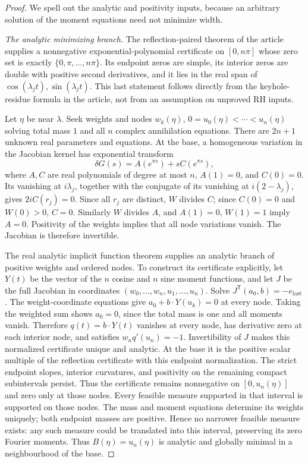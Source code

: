 \begin{proof}
We spell out the analytic and positivity inputs, because an arbitrary
solution of the moment equations need not minimize width.

\emph{The analytic minimizing branch.}
The reflection-paired theorem of the article supplies a nonnegative
exponential-polynomial certificate on $[0,n\pi]$ whose zero set is exactly
$\{0,\pi,\ldots,n\pi\}$. Its endpoint zeros are simple, its interior zeros
are double with positive second derivatives, and it lies in the real span of
$\cos(\lambda_jt),\sin(\lambda_jt)$. This last statement follows directly
from the keyhole-residue formula in the article, not from an assumption on
unproved RH inputs.

Let $\eta$ be near $\lambda$. Seek weights and nodes
$w_k(\eta)$, $0=u_0(\eta)<\cdots<u_n(\eta)$ solving total mass $1$ and
all $n$ complex annihilation equations. There are $2n+1$ unknown real
parameters and equations. At the base, a homogeneous variation in the
Jacobian kernel has exponential transform
\[
 \delta G(s)=A(e^{\pi s})+sC(e^{\pi s}),
\]
where $A,C$ are real polynomials of degree at most $n$, $A(1)=0$, and
$C(0)=0$. Its vanishing at $i\lambda_j$, together with the conjugate of
its vanishing at $i(2-\lambda_j)$, gives
$2iC(r_j)=0$. Since all $r_j$ are distinct, $W$ divides $C$; since
$C(0)=0$ and $W(0)>0$, $C=0$. Similarly $W$ divides $A$, and
$A(1)=0$, $W(1)=1$ imply $A=0$. Positivity of the weights implies that
all node variations vanish. The Jacobian is therefore invertible.

The real analytic implicit function theorem supplies an analytic branch of
positive weights and ordered nodes. To construct its certificate explicitly,
let $Y(t)$ be the vector of the $n$ cosine and $n$ sine moment functions,
and let $J$ be the full Jacobian in coordinates
$(w_0,\ldots,w_n,u_1,\ldots,u_n)$. Solve
$J^{\mathsf T}(a_0,b)=-e_{\mathrm{last}}$. The weight-coordinate equations
give $a_0+b\cdot Y(u_k)=0$ at every node. Taking the weighted sum shows
$a_0=0$, since the total mass is one and all moments vanish. Therefore
$q(t)=b\cdot Y(t)$ vanishes at every node, has derivative zero at each
interior node, and satisfies $w_nq'(u_n)=-1$. Invertibility of $J$
makes this normalized certificate unique and analytic. At the base it
is the positive scalar multiple of the reflection certificate with this
endpoint normalization. The strict endpoint slopes, interior
curvatures, and positivity on the remaining compact subintervals persist.
Thus the certificate remains nonnegative on $[0,u_n(\eta)]$ and zero only
at those nodes. Every feasible measure supported in that interval is
supported on those nodes. The mass and moment equations determine its
weights uniquely; both endpoint masses are positive. Hence no narrower
feasible measure exists: any such measure could be translated into this
interval, preserving its zero Fourier moments. Thus $B(\eta)=u_n(\eta)$ is analytic and globally
minimal in a neighbourhood of the base.


\end{proof}
